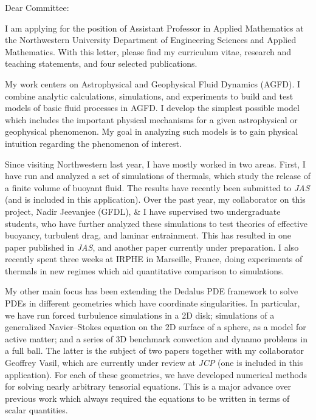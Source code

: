 \documentclass[12pt,pdf]{letter}
\begin{document}
\address{\ \\ \  \\ \\ \\ \\ \\ \\ \\
Chair \\
Committee on Hiring \\
Engineering Sciences and Applied Mathematics \\
Northwestern University.
}

\opening{Dear Committee:}

I am applying for the position of Assistant Professor in Applied Mathematics at the Northwestern University Department of Engineering Sciences and Applied Mathematics.  With this letter, please find my curriculum vitae, research and teaching statements, and four selected publications.

My work centers on Astrophysical and Geophysical Fluid Dynamics (AGFD).  I combine analytic calculations, simulations, and experiments to build and test models of basic fluid processes in AGFD.  I develop the simplest possible model which includes the important physical mechanisms for a given astrophysical or geophysical phenomenon.  My goal in analyzing such models is to gain physical intuition regarding the phenomenon of interest.

Since visiting Northwestern last year, I have mostly worked in two areas. First, I have run and analyzed a set of simulations of thermals, which study the release of a finite volume of buoyant fluid. The results have recently been submitted to {\it JAS} (and is included in this application). Over the past year, my collaborator on this project, Nadir Jeevanjee (GFDL), \& I have supervised two undergraduate students, who have further analyzed these simulations to test theories of effective buoyancy, turbulent drag, and laminar entrainment. This has resulted in one paper published in {\it JAS}, and another paper currently under preparation. I also recently spent three weeks at IRPHE in Marseille, France, doing experiments of thermals in new regimes which aid quantitative comparison to simulations.

My other main focus has been extending the Dedalus PDE framework to solve PDEs in different geometries which have coordinate singularities. In particular, we have run forced turbulence simulations in a 2D disk; simulations of a generalized Navier--Stokes equation on the 2D surface of a sphere, as a model for active matter; and a series of 3D benchmark convection and dynamo problems in a full ball. The latter is the subject of two papers together with my collaborator Geoffrey Vasil, which are currently under review at {\it JCP} (one is included in this application). For each of these geometries, we have developed numerical methods for solving nearly arbitrary tensorial equations. This is a major advance over previous work which always required the equations to be written in terms of scalar quantities.
\end{document}
